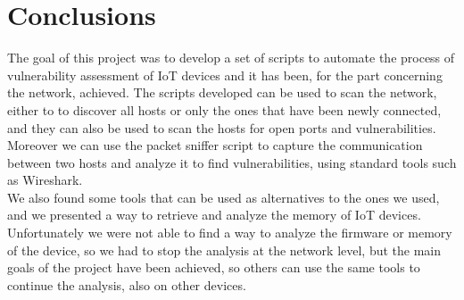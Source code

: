 \chapter{Conclusions}
The goal of this project was to develop a set of scripts to automate the process
of vulnerability assessment of IoT devices and it has been, for the part concerning
the network, achieved. The scripts developed can be used to scan the network, either
to to discover all hosts or only the ones that have been newly connected, and
they can also be used to scan the hosts for open ports and vulnerabilities.\\
Moreover we can use the packet sniffer script to capture the communication between
two hosts and analyze it to find vulnerabilities, using standard tools such as Wireshark.\\
We also found some tools that can be used as alternatives to the ones we used,
and we presented a way to retrieve and analyze the memory of IoT devices.\\
Unfortunately we were not able to find a way to analyze the firmware or memory of the device,
so we had to stop the analysis at the network level, but the main goals of the
project have been achieved, so others can use the same tools to continue the analysis,
also  on other devices.